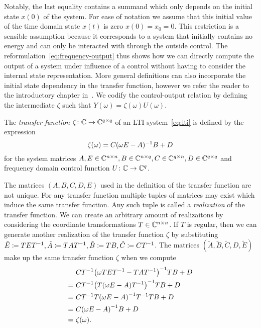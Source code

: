Notably, the last equality contains a summand which only depends on the initial state $x(0)$ of the system.
For ease of notation we assume that this initial value of the time domain state $x(t)$ is zero $x(0) = x_0 = 0$.
This restriction is a sensible assumption because it corresponds to a system that initially contains no energy and can only be interacted with through the outside control.
The reformulation~\eqref{eq:frequency-output} thus shows how we can directly compute the output of a system under influence of a control without having to consider the internal state representation.
More general definitions can also incorporate the initial state dependency in the transfer function, however we refer the reader to the introductory chapter in~\cite{Benner2017}.
We codify the control-output relation by defining the intermediate $\zeta$ such that $Y(\omega) = \zeta(\omega) U(\omega)$.

\begin{definition}\label{def:transfer-function}
    The \emph{transfer function} $\zeta \colon \mathbb{C} \to \mathbb{C}^{q \times q}$ of an LTI system~\eqref{eq:lti} is defined by the expression
    \begin{equation}\label{eq:transfer-function}
        \zeta(\omega) = C (\omega E - A)^{-1} B + D
    \end{equation}
    for the system matrices $A, E \in \mathbb{C}^{n \times n}, B \in \mathbb{C}^{n \times q}, C \in \mathbb{C}^{q \times n}, D \in \mathbb{C}^{q \times q}$ and frequency domain control function $U \colon \mathbb{C} \to \mathbb{C}^{q}$.
\end{definition}

\begin{remark}
    The matrices $(A, B, C, D, E)$ used in the definition of the transfer function are not unique.
    For any transfer function multiple tuples of matrices may exist which induce the same transfer function.
    Any such tuple is called a \emph{realization} of the transfer function.
    We can create an arbitrary amount of realizaitons by considering the coordinate transformations $T \in \mathbb{C}^{n \times n}$.
    If $T$ is regular, then we can generate another realization of the transfer function $\zeta$ by substituting $\tilde{E} \coloneqq T E T^{-1}, \tilde{A} \coloneqq T A T^{-1}, \tilde{B} \coloneqq T B, \tilde{C} \coloneqq C T^{-1}$.
    The matrices $(\tilde{A}, \tilde{B}, \tilde{C}, D, \tilde{E})$ make up the same transfer function $\zeta$ when we compute
    \begin{align*}
        &C T^{-1} {\left( \omega T E T^{-1} - T A T^{-1} \right)}^{-1} T B + D \\
        =\ &C T^{-1} {\left( T (\omega E - A) T^{-1} \right)}^{-1} T B + D \\
        =\ &C T^{-1} T {\left( \omega E - A \right)}^{-1} T^{-1} T B + D \\
        =\ &C {(\omega E - A)}^{-1} B + D \\
        =\ &\zeta(\omega).
    \end{align*}
\end{remark}

